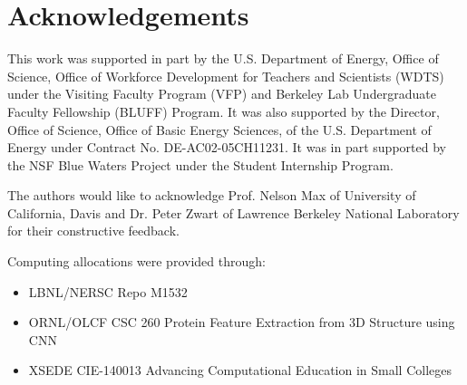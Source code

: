 \documentclass{article}
\begin{document}
\section{Acknowledgements}

This work was supported in part by the U.S. Department of Energy, Office of Science, Office of Workforce Development for Teachers and Scientists (WDTS) under the Visiting Faculty Program (VFP) and Berkeley Lab Undergraduate Faculty Fellowship (BLUFF) Program. It was also supported by the Director, Office of Science, Office of Basic Energy Sciences, of the U.S. Department of Energy under Contract No. DE-AC02-05CH11231. It was in part supported by the NSF Blue Waters Project under the Student Internship Program.

The authors would like to acknowledge Prof. Nelson Max of University of California, Davis and Dr. Peter Zwart of Lawrence Berkeley National Laboratory for their constructive feedback.

Computing allocations were provided through:
  \begin{itemize}
    \item LBNL/NERSC Repo M1532
    \item ORNL/OLCF CSC 260 Protein Feature Extraction from 3D Structure using CNN
    \item XSEDE CIE-140013 Advancing Computational Education in Small Colleges
  \end{itemize}




\small


\end{document}
